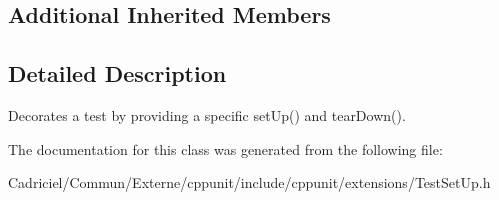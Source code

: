\subsection*{Additional Inherited Members}


\subsection{Detailed Description}
Decorates a test by providing a specific set\+Up() and tear\+Down(). 

The documentation for this class was generated from the following file\+:\begin{DoxyCompactItemize}
\item 
Cadriciel/\+Commun/\+Externe/cppunit/include/cppunit/extensions/Test\+Set\+Up.\+h\end{DoxyCompactItemize}
